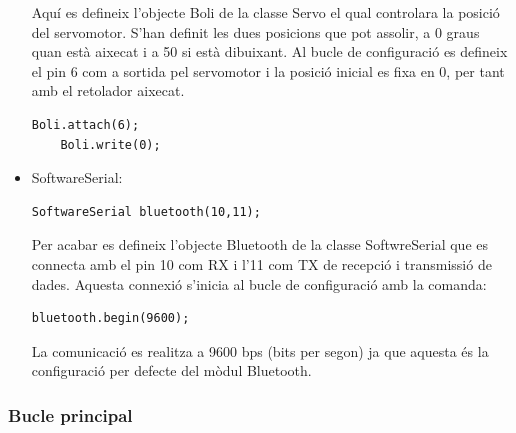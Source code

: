 \begin{itemize}
	Aquí es defineix l’objecte Boli de la classe Servo el qual controlara la posició del servomotor. S’han definit les dues posicions que pot assolir, a 0 graus quan està aixecat i a 50 si està dibuixant. Al bucle de configuració es defineix el pin 6 com a sortida pel servomotor i la posició inicial es fixa en 0, per tant amb el retolador aixecat.
	\begin{lstlisting}[style=Arduino]
	Boli.attach(6);
	Boli.write(0);
	\end{lstlisting}
	
	\item SoftwareSerial:
	\begin{lstlisting}[style=Arduino]
	SoftwareSerial bluetooth(10,11);
	\end{lstlisting}

	Per acabar es defineix l’objecte Bluetooth de la classe SoftwreSerial que es connecta amb el pin 10 com RX i l’11 com TX de recepció i transmissió de dades. Aquesta connexió s’inicia al bucle de configuració amb la comanda: 
	\begin{lstlisting}[style=Arduino]
	bluetooth.begin(9600);
	\end{lstlisting}

	La comunicació es realitza a 9600 bps (bits per segon) ja que aquesta és la configuració per defecte del mòdul Bluetooth. 
	
	
\end{itemize}


\subsubsection{Bucle principal}


